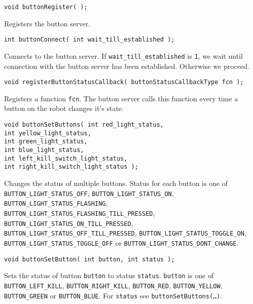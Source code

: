 \documentclass{article}
\begin{document}
\begin{description}
  
\item \texttt{void buttonRegister( );}

  Registers the button server.
 
\item \texttt{int buttonConnect( int wait\_till\_established );} 
  
  Connects to the button server. If \texttt{wait\_till\_established} is
  \texttt{1}, we wait until connection with the button server has been
  established. Otherwise we proceed.
 
\item \texttt{void registerButtonStatusCallback( buttonStatusCallbackType fcn
    );} 
  
  Registers a function \texttt{fcn}. The button server calls this function
  every time a button on the robot changes it's state.

\item \texttt{void buttonSetButtons( int red\_light\_status,\\
    int yellow\_light\_status,\\
    int green\_light\_status,\\
    int blue\_light\_status,\\
    int left\_kill\_switch\_light\_status,\\
    int right\_kill\_switch\_light\_status );}
  
  Changes the status of multiple buttons. Status for each button is one of\\
  \texttt{BUTTON\_LIGHT\_STATUS\_OFF}, \texttt{BUTTON\_LIGHT\_STATUS\_ON},
  \texttt{BUTTON\_LIGHT\_STATUS\_FLASHING},\\
  \texttt{BUTTON\_LIGHT\_STATUS\_FLASHING\_TILL\_PRESSED},
  \texttt{BUTTON\_LIGHT\_STATUS\_ON\_TILL\_PRESSED},
  \texttt{BUTTON\_LIGHT\_STATUS\_OFF\_TILL\_PRESSED},
  \texttt{BUTTON\_LIGHT\_STATUS\_TOGGLE\_ON},\\
  \texttt{BUTTON\_LIGHT\_STATUS\_TOGGLE\_OFF} or
  \texttt{BUTTON\_LIGHT\_STATUS\_DONT\_CHANGE}.

\item \texttt{void buttonSetButton( int button, int status );}
  
  Sets the status of button \texttt{button} to status \texttt{status}.
  \texttt{button} is one of \texttt{BUTTON\_LEFT\_KILL},
  \texttt{BUTTON\_RIGHT\_KILL}, \texttt{BUTTON\_RED}, \texttt{BUTTON\_YELLOW},
  \texttt{BUTTON\_GREEN} or \texttt{BUTTON\_BLUE}. For \texttt{status} see
  \texttt{buttonSetButtons(\dots)}.


\end{description}
\end{document}
